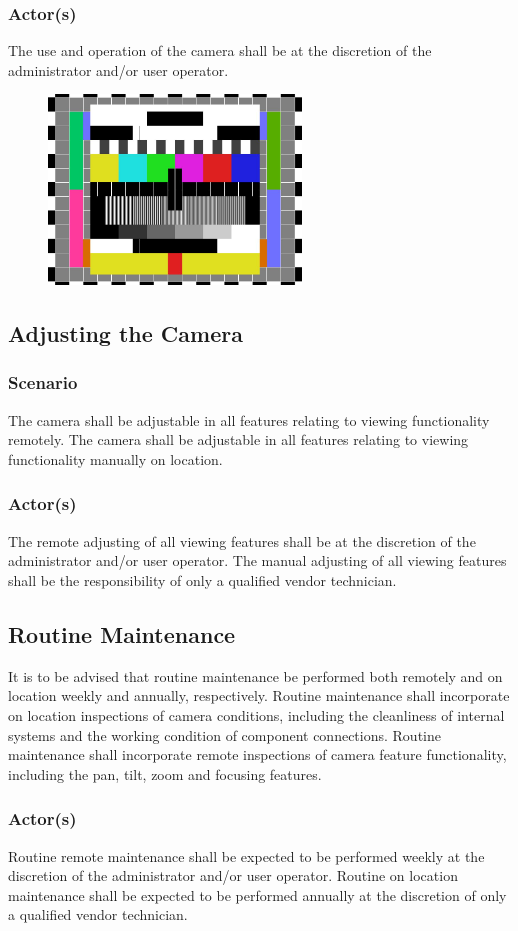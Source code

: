 \subsubsection{Actor(s)}
The use and operation of the camera shall be at the discretion of the administrator and/or user operator.
\vspace{0.5 in}
\begin{figure}[h!]
	\centering
   	\includegraphics[width=0.60\textwidth]{images/test_image}
\end{figure}
\vspace{0.5 in}
\subsection{Adjusting the Camera}
\subsubsection{Scenario}
The camera shall be adjustable in all features relating to viewing functionality remotely.
The camera shall be adjustable in all features relating to viewing functionality manually on location.
\subsubsection{Actor(s)}
The remote adjusting of all viewing features shall be at the discretion of the administrator and/or user operator.
The manual adjusting of all viewing features shall be the responsibility of only a qualified vendor technician.
\subsection{Routine Maintenance}
It is to be advised that routine maintenance be performed both remotely and on location weekly and annually, respectively.
Routine maintenance shall incorporate on location inspections of camera conditions, including the cleanliness of internal systems and the working condition of component connections.
Routine maintenance shall incorporate remote inspections of camera feature functionality, including the pan, tilt, zoom and focusing features.
\subsubsection{Actor(s)}
Routine remote maintenance shall be expected to be performed weekly at the discretion of the administrator and/or user operator.
Routine on location maintenance shall be expected to be performed annually at the discretion of only a qualified vendor technician.
